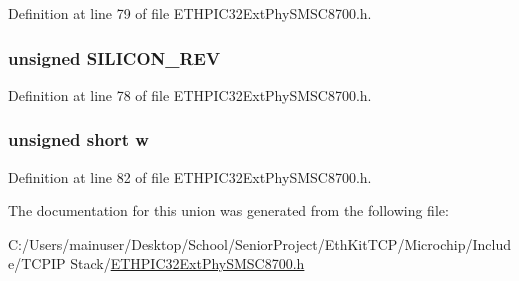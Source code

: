 Definition at line 79 of file E\+T\+H\+P\+I\+C32\+Ext\+Phy\+S\+M\+S\+C8700.\+h.

\hypertarget{union_____s_i_l_i_c_o_n_r_e_vbits__t_af70c9f0ac03ef3278000e7a3435db01a}{}
\subsubsection[{S\+I\+L\+I\+C\+O\+N\+\_\+\+R\+E\+V}]{\setlength{\rightskip}{0pt plus 5cm}unsigned S\+I\+L\+I\+C\+O\+N\+\_\+\+R\+E\+V}\label{union_____s_i_l_i_c_o_n_r_e_vbits__t_af70c9f0ac03ef3278000e7a3435db01a}


Definition at line 78 of file E\+T\+H\+P\+I\+C32\+Ext\+Phy\+S\+M\+S\+C8700.\+h.

\hypertarget{union_____s_i_l_i_c_o_n_r_e_vbits__t_a160850a4684a3e82c2323033964f2e98}{}
\subsubsection[{w}]{\setlength{\rightskip}{0pt plus 5cm}unsigned short w}\label{union_____s_i_l_i_c_o_n_r_e_vbits__t_a160850a4684a3e82c2323033964f2e98}


Definition at line 82 of file E\+T\+H\+P\+I\+C32\+Ext\+Phy\+S\+M\+S\+C8700.\+h.



The documentation for this union was generated from the following file\+:\begin{DoxyCompactItemize}
\item 
C\+:/\+Users/mainuser/\+Desktop/\+School/\+Senior\+Project/\+Eth\+Kit\+T\+C\+P/\+Microchip/\+Include/\+T\+C\+P\+I\+P Stack/\hyperlink{_e_t_h_p_i_c32_ext_phy_s_m_s_c8700_8h}{E\+T\+H\+P\+I\+C32\+Ext\+Phy\+S\+M\+S\+C8700.\+h}\end{DoxyCompactItemize}
